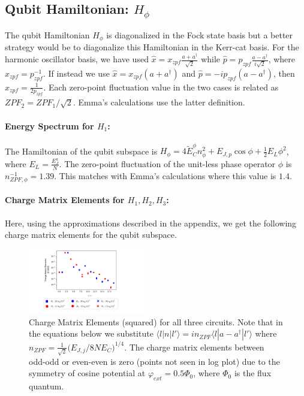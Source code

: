 \documentclass[%
reprint,
superscriptaddress,
 amsmath,amssymb,
 aps,
 prx,
longbibliography,
floatfix,
]{revtex4-2}
\begin{document}
\subsection{Qubit Hamiltonian: $H_\phi$}
The qubit Hamiltonian $H_{\phi}$ is diagonalized in the Fock state basis but a better strategy would be to diagonalize this Hamiltonian in the Kerr-cat basis. For the harmonic oscillator basis, we have used $\hat x=x_{zpf}\frac{a+a^\dagger}{\sqrt{2}}$ while $\hat p=p_{zpf}\frac{a-a^\dagger}{i\sqrt{2}}$, where $x_{zpf}=p_{zpf}^{-1}$. If instead we use $\hat x=x_{zpf}(a+a^\dagger)$ and $\hat p=-ip_{zpf}(a-a^\dagger)$, then $x_{zpf}=\frac{1}{2p_{zpf}}$. Each zero-point fluctuation value in the two cases is related as $ZPF_2=ZPF_1/\sqrt{2}$. Emma's calculations use the latter definition.
\paragraph{Energy Spectrum for $H_1$:}
The Hamiltonian of the qubit subspace is $H_\phi=4\tilde{E}_C^\phi n_\phi^2+E_{J,p}\cos{\phi}+\frac{1}{2}E_L\phi^2$, where $E_L=\frac{E_J^a}{N}$. The zero-point fluctuation of the unit-less phase operator $\phi$ is $n_{ZPF,\phi}^{-1}=1.39$. This matches with Emma's calculations where this value is $1.4$. 
\paragraph{Charge Matrix Elements for $H_1,H_2,H_3$:}
Here, using the approximations described in the appendix, we get the following charge matrix elements for the qubit subspace.
\begin{figure}[tbh]
    \centering
\includegraphics[width=0.45\textwidth]{Figures/Charge_Matrix.pdf}
    \caption{Charge Matrix Elements (squared) for all three circuits. Note that in the equations below we substitute $\langle l|n|l'\rangle=in_{ZPF}\langle l|a-a^\dagger|l'\rangle$ where $n_{ZPF}=\frac{1}{\sqrt{2}}\Big(E_{J,j}/8NE_C\Big)^{1/4}$. The charge matrix elements between odd-odd or even-even is zero (points not seen in log plot) due to the symmetry of cosine potential at $\varphi_{ext}=0.5\Phi_0$, where $\Phi_0$ is the flux quantum.}
    \label{charge-matrix}
\end{figure}
\end{document}
